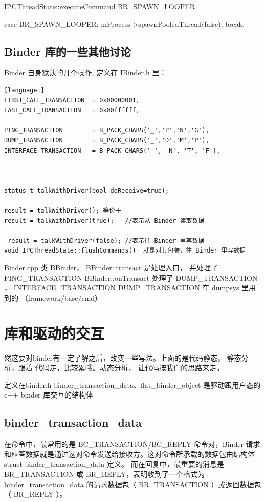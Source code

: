 \documentclass[a4paper,11pt]{article}
\begin{document}
IPCThreadState::executeCommand  BR_SPAWN_LOOPER 

case BR_SPAWN_LOOPER:
        mProcess->spawnPooledThread(false);
        break;


\subsection{Binder 库的一些其他讨论}
Binder 自身默认的几个操作, 定义在 IBinder.h 里：
\begin{lstlisting}[language=]
FIRST_CALL_TRANSACTION  = 0x00000001,
LAST_CALL_TRANSACTION   = 0x00ffffff,

PING_TRANSACTION        = B_PACK_CHARS('_','P','N','G'),
DUMP_TRANSACTION        = B_PACK_CHARS('_','D','M','P'),
INTERFACE_TRANSACTION   = B_PACK_CHARS('_', 'N', 'T', 'F'),



status_t talkWithDriver(bool doReceive=true);

result = talkWithDriver(); 等价于
result = talkWithDriver(true);   //表示从 Binder 读取数据

 result = talkWithDriver(false); //表示往 Binder 里写数据
void IPCThreadState::flushCommands()  就是对其包装，往 Binder 里写数据
\end{lstlisting}
Binder.cpp  类 BBinder，
BBinder::transact 是处理入口， 并处理了  PING_TRANSACTION 
BBinder::onTransact 处理了 DUMP_TRANSACTION ， INTERFACE_TRANSACTION 
DUMP_TRANSACTION 在 dumpsys 里用到的 （framework/base/cmd）

\section{库和驱动的交互}
然这要对binder有一定了解之后，改变一些写法。上面的是代码静态， 静态分析，跟着
代码走，比较累哦。动态分析， 让代码按我们的思路来走。

定义在binder.h binder_transaction_data、flat_binder_object 是驱动跟用户态的
c++ binder 库交互的结构体

\subsection{binder_transaction_data}\label{BinderTransaction}
在命令中，最常用的是 BC_TRANSACTION/BC_REPLY 命令对，Binder
请求和应答数据就是通过这对命令发送给接收方。这对命令所承载的数据包由结构体
struct binder_transaction_data 定义。
而在回复中，最重要的消息是 BR_TRANSACTION 或 BR_REPLY，表明收到了一个格式为
binder_transaction_data 的请求数据包（ BR_TRANSACTION ）或返回数据包（ BR_REPLY
）。
\end{document}
